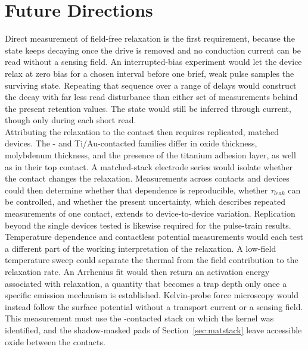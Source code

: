 \section[Future Directions]{Future Directions}
\label{sec:8p2}


\noindent Direct measurement of field-free relaxation is the first requirement, because the state keeps decaying once
the drive is removed and no conduction current can be read without a sensing field. An interrupted-bias experiment
would let the device relax at zero bias for a chosen interval before one brief, weak pulse samples the surviving state.
Repeating that sequence over a range of delays would construct the decay with far less read disturbance than either set
of measurements behind the present retention values. The state would still be inferred through current, though only
during each short read.\\

\noindent Attributing the relaxation to the contact then requires replicated, matched devices. The - and
Ti/Au-contacted families differ in oxide thickness, molybdenum thickness, and the presence of the titanium adhesion
layer, as well as in their top contact. A matched-stack electrode series would isolate whether the contact changes the
relaxation. Measurements across contacts and devices could then determine whether that dependence is reproducible,
whether $\tau_{leak}$ can be controlled, and whether the present uncertainty, which describes repeated measurements of
one contact, extends to device-to-device variation. Replication beyond the single devices tested is likewise required
for the pulse-train results.\\

\noindent Temperature dependence and contactless potential measurements would each test a different part of the
working interpretation of the relaxation. A low-field temperature sweep could separate the thermal from the field contribution to the relaxation
rate. An Arrhenius fit would then return an activation energy associated with relaxation, a quantity that becomes a
trap depth only once a specific emission mechanism is established. Kelvin-probe force microscopy would instead follow
the surface potential without a transport current or a sensing field. This measurement must use the
-contacted stack on which the kernel was identified, and the shadow-masked pads of
Section~\ref{sec:matstack} leave accessible oxide between the contacts.\\

